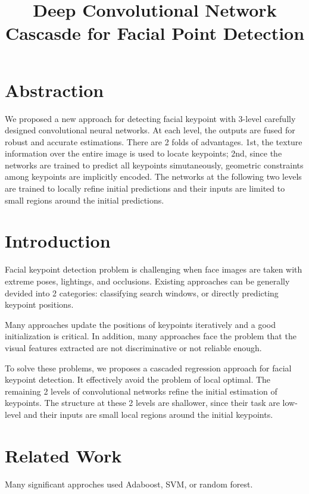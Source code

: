 \documentclass{ctexart}
\begin{document}
\setlength{\parindent}{0pt}

\title{Deep Convolutional Network Cascasde for Facial Point Detection}
\maketitle

\section{Abstraction}
We proposed a new approach for detecting facial keypoint with 3-level carefully designed
convolutional neural networks. At each level, the outputs are fused for robust and accurate
estimations. There are 2 folds of advantages. 1st, the texture information over the entire
image is used to locate keypoints; 2nd, since the networks are trained to predict all keypoints
simutaneously, geometric constraints among keypoints are implicitly encoded.
The networks at the following two levels are trained to locally refine initial predictions and
their inputs are limited to small regions around the initial predictions.

\section{Introduction}
Facial keypoint detection problem is challenging when face images are taken with extreme poses,
lightings, and occlusions. Existing approaches can be generally devided into 2 categories:
classifying search windows, or directly predicting keypoint positions.

Many approaches update the positions of keypoints iteratively and a good initialization is
critical. In addition, many approaches face the problem that the visual features extracted are
not discriminative or not reliable enough.

To solve these problems, we proposes a cascaded regression approach for facial keypoint detection.
It effectively avoid the problem of local optimal. The remaining 2 levels of convolutional networks
refine the initial estimation of keypoints. The structure at these 2 levels are shallower, since
their task are low-level and their inputs are small local regions around the initial keypoints.

\section{Related Work}
Many significant approches used Adaboost, SVM, or random forest.
\end{document}
